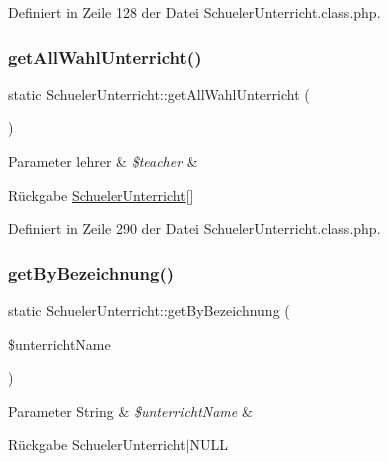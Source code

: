 Definiert in Zeile 128 der Datei Schueler\+Unterricht.\+class.\+php.

\mbox{\label{class_schueler_unterricht_ac3493503dbea444a63a49a17a58499b3}} 
\subsubsection{\texorpdfstring{get\+All\+Wahl\+Unterricht()}{getAllWahlUnterricht()}}
{\footnotesize\ttfamily static Schueler\+Unterricht\+::get\+All\+Wahl\+Unterricht (\begin{DoxyParamCaption}{ }\end{DoxyParamCaption})\hspace{0.3cm}{\ttfamily [static]}}


\begin{DoxyParams}[1]{Parameter}
lehrer & {\em \$teacher} & \\
\hline
\end{DoxyParams}
\begin{DoxyReturn}{Rückgabe}
\mbox{\hyperlink{class_schueler_unterricht}{Schueler\+Unterricht}}\mbox{[}\mbox{]} 
\end{DoxyReturn}


Definiert in Zeile 290 der Datei Schueler\+Unterricht.\+class.\+php.

\mbox{\label{class_schueler_unterricht_ac92f297147c2c13dae33b11d184892e5}} 
\subsubsection{\texorpdfstring{get\+By\+Bezeichnung()}{getByBezeichnung()}}
{\footnotesize\ttfamily static Schueler\+Unterricht\+::get\+By\+Bezeichnung (\begin{DoxyParamCaption}\item[{}]{\$unterricht\+Name }\end{DoxyParamCaption})\hspace{0.3cm}{\ttfamily [static]}}


\begin{DoxyParams}[1]{Parameter}
String & {\em \$unterricht\+Name} & \\
\hline
\end{DoxyParams}
\begin{DoxyReturn}{Rückgabe}
Schueler\+Unterricht$\vert$\+N\+U\+LL 
\end{DoxyReturn}


